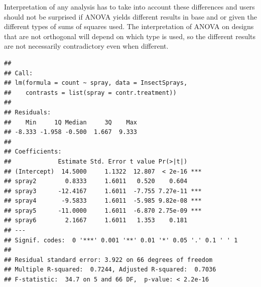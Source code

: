 \documentclass[krantz2]{krantz}\usepackage{knitr}
\begin{document}
\begin{warningbox}
Interpretation of any analysis has to take into account these differences and users should not be surprised if ANOVA yields different results in base \Rlang and  or  given the different types of sums of squares used. The interpretation of ANOVA on designs that are not orthogonal will depend on which type is used, so the different results are not necessarily contradictory even when different.

\begin{knitrout}\footnotesize
{}\color{fgcolor}\begin{kframe}
\begin{alltt}
\end{alltt}
\begin{verbatim}
##
## Call:
## lm(formula = count ~ spray, data = InsectSprays, 
##    contrasts = list(spray = contr.treatment))
##
## Residuals:
##    Min     1Q Median     3Q    Max
## -8.333 -1.958 -0.500  1.667  9.333
##
## Coefficients:
##             Estimate Std. Error t value Pr(>|t|)
## (Intercept)  14.5000     1.1322  12.807  < 2e-16 ***
## spray2        0.8333     1.6011   0.520    0.604
## spray3      -12.4167     1.6011  -7.755 7.27e-11 ***
## spray4       -9.5833     1.6011  -5.985 9.82e-08 ***
## spray5      -11.0000     1.6011  -6.870 2.75e-09 ***
## spray6        2.1667     1.6011   1.353    0.181
## ---
## Signif. codes:  0 '***' 0.001 '**' 0.01 '*' 0.05 '.' 0.1 ' ' 1
##
## Residual standard error: 3.922 on 66 degrees of freedom
## Multiple R-squared:  0.7244,	Adjusted R-squared:  0.7036
## F-statistic:  34.7 on 5 and 66 DF,  p-value: < 2.2e-16
\end{verbatim}
\end{kframe}
\end{knitrout}


\end{warningbox}
\end{document}
